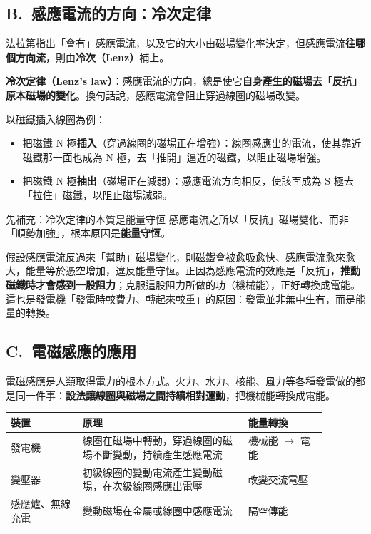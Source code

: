 \documentclass[11pt]{article}
\begin{document}
\subsection*{\sffamily B.\ 感應電流的方向：冷次定律}

法拉第指出「會有」感應電流，以及它的大小由磁場變化率決定，但感應電流\textbf{往哪個方向流}，則由\textbf{冷次（Lenz）}補上。

\textbf{冷次定律（Lenz's law）}：感應電流的方向，總是使它\textbf{自身產生的磁場去「反抗」原本磁場的變化}。換句話說，感應電流會阻止穿過線圈的磁場改變。

以磁鐵插入線圈為例：

\begin{itemize}\setlength{\itemsep}{1pt}
\item 把磁鐵 N 極\textbf{插入}（穿過線圈的磁場正在增強）：線圈感應出的電流，使其靠近磁鐵那一面也成為 N 極，去「推開」逼近的磁鐵，以阻止磁場增強。
\item 把磁鐵 N 極\textbf{抽出}（磁場正在減弱）：感應電流方向相反，使該面成為 S 極去「拉住」磁鐵，以阻止磁場減弱。
\end{itemize}

\begin{補充框}{先補充：冷次定律的本質是能量守恆}
感應電流之所以「反抗」磁場變化、而非「順勢加強」，根本原因是\textbf{能量守恆}。

假設感應電流反過來「幫助」磁場變化，則磁鐵會被愈吸愈快、感應電流愈來愈大，能量等於憑空增加，違反能量守恆。正因為感應電流的效應是「反抗」，\textbf{推動磁鐵時才會感到一股阻力}；克服這股阻力所做的功（機械能），正好轉換成電能。這也是發電機「發電時較費力、轉起來較重」的原因：發電並非無中生有，而是能量的轉換。
\end{補充框}

\subsection*{\sffamily C.\ 電磁感應的應用}

電磁感應是人類取得電力的根本方式。火力、水力、核能、風力等各種發電做的都是同一件事：\textbf{設法讓線圈與磁場之間持續相對運動}，把機械能轉換成電能。

\begin{center}
\renewcommand{\arraystretch}{1.35}
\begin{tabular}{p{0.20\linewidth} p{0.46\linewidth} p{0.22\linewidth}}
\hline
\textbf{裝置} & \textbf{原理} & \textbf{能量轉換} \\
\hline
發電機 & 線圈在磁場中轉動，穿過線圈的磁場不斷變動，持續產生感應電流 & 機械能 $\rightarrow$ 電能 \\
變壓器 & 初級線圈的變動電流產生變動磁場，在次級線圈感應出電壓 & 改變交流電壓 \\
感應爐、無線充電 & 變動磁場在金屬或線圈中感應電流 & 隔空傳能 \\
\hline
\end{tabular}
\end{center}
\end{document}
